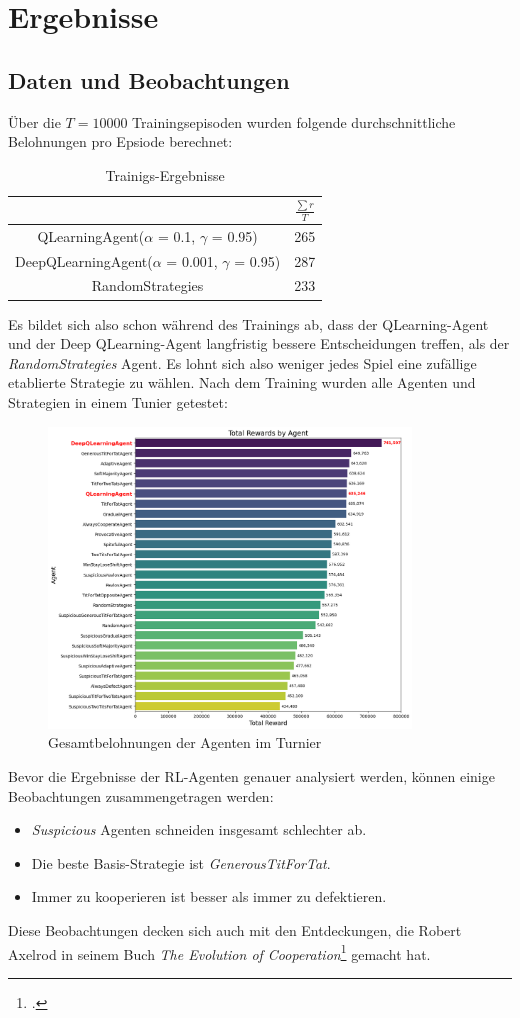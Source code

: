 \chapter{Ergebnisse}
\section{Daten und Beobachtungen}
Über die $T = 10000$ Trainingsepisoden wurden folgende durchschnittliche Belohnungen pro Epsiode berechnet:
\begin{table}[H]
    \centering
    \begin{tabular}{c|c}
            & $\frac{\sum r}{T}$ \\
        \hline
        QLearningAgent($\alpha$ = 0.1, $\gamma$ = 0.95)  & 265 \\
        \hline
        DeepQLearningAgent($\alpha$ = 0.001, $\gamma$ = 0.95) & 287 \\
        \hline
        RandomStrategies & 233
    \end{tabular}
    \caption{Trainigs-Ergebnisse}
    \label{table:trainingsergebnisse}
\end{table}
Es bildet sich also schon während des Trainings ab, dass der QLearning-Agent und der Deep QLearning-Agent langfristig
bessere Entscheidungen treffen, als der \textit{RandomStrategies} Agent. Es lohnt sich also weniger jedes Spiel
eine zufällige etablierte Strategie zu wählen.
Nach dem Training wurden alle Agenten und Strategien in einem Tunier getestet:
\begin{figure}[H]
    \centering
    \includegraphics[height=8cm]{../poster/logos/tournament.png}
    \caption{Gesamtbelohnungen der Agenten im Turnier}
    \label{fig:gesamtbelohnungen}
\end{figure}
Bevor die Ergebnisse der RL-Agenten genauer analysiert werden, können einige Beobachtungen zusammengetragen werden:
\begin{itemize}
    \item \textit{Suspicious} Agenten schneiden insgesamt schlechter ab.
    \item Die beste Basis-Strategie ist \textit{GenerousTitForTat}.
    \item Immer zu kooperieren ist besser als immer zu defektieren.
\end{itemize}
Diese Beobachtungen decken sich auch mit den Entdeckungen, die Robert Axelrod in seinem Buch 
\textit{The Evolution of Cooperation}\footcite{axelrod1984cooperation} gemacht hat.

